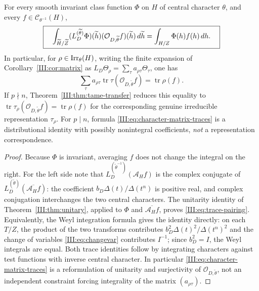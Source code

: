 \begin{proposition}\label{III:prop:trace-pair}
For every smooth invariant class function $\Phi$ on $H$ of central
character $\theta$, and every $f\in\mathcal C_{\theta^{-1}}(H)$,
\begin{equation}\label{III:eq:trace-pairing}
\boxed{\quad
\int_{\widetilde H/\widetilde Z}
(L_D^{(\widetilde\theta)}\Phi)(\widetilde h)
 (\mathcal O_{D,\widetilde\theta}f)(\widetilde h)\,d\widetilde h
=\int_{H/Z}\Phi(h)f(h)\,dh.
\quad}
\end{equation}
In particular, for $\rho\in\operatorname{Irr}_\theta(H)$, writing the finite
expansion of Corollary~\ref{III:cor:matrix} as
$L_D\Theta_\rho=\sum_\tau a_{\rho\tau}\Theta_\tau$, one has
\begin{equation}\label{III:eq:character-matrix-traces}
\sum_\tau a_{\rho\tau}
\operatorname{tr}\tau(\mathcal O_{D,\widetilde\theta}f)
=\operatorname{tr}\rho(f).
\end{equation}
If $p\nmid n$, Theorem~\ref{III:thm:tame-transfer} reduces this equality to
$\operatorname{tr}\tau_\rho(\mathcal O_{D,\widetilde\theta}f)
=\operatorname{tr}\rho(f)$ for the corresponding genuine irreducible
representation $\tau_\rho$. For $p\mid n$, formula
\eqref{III:eq:character-matrix-traces} is a distributional identity with
possibly nonintegral coefficients, \emph{not} a representation
correspondence.
\end{proposition}
\begin{proof}
Because $\Phi$ is invariant, averaging $f$ does not change the integral
on the right. For the left side note that
$L_D^{(\widetilde\theta^{-1})}(\mathcal A_H f)$ is the complex
conjugate of
$L_D^{(\widetilde\theta)}(\overline{\mathcal A_H f})$:
the coefficient $b_D\Delta(t)/\Delta(t^n)$ is positive real, and
complex conjugation interchanges the two central characters.
The unitarity identity of Theorem~\ref{III:thm:unitary}, applied to $\Phi$
and $\overline{\mathcal A_H f}$, proves
\eqref{III:eq:trace-pairing}.
Equivalently, the Weyl integration formula gives the identity directly:
on each $T/Z$, the product of the two transforms contributes
$b_D^2\Delta(t)^2/\Delta(t^n)^2$ and the change of variables
\eqref{III:eq:changevar} contributes $I^{-1}$; since $b_D^2=I$, the
Weyl integrals are equal. Both trace identities follow by integrating
characters against test functions with inverse central character.
In particular \eqref{III:eq:character-matrix-traces} is a reformulation
of unitarity and surjectivity of $\mathcal O_{D,\widetilde\theta}$,
not an independent constraint forcing integrality of the matrix
$(a_{\rho\tau})$.
\end{proof}

